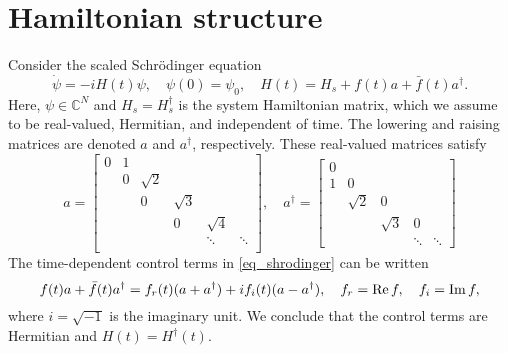 \documentclass[11pt]{article}
\begin{document}



\section{Hamiltonian structure}
Consider the scaled Schr\"odinger equation
\begin{equation}\label{eq_shrodinger}
\dot{\psi} = -i H(t) \psi,\quad \psi(0) = \psi_0,\quad H(t) = H_s + f(t)a + \bar{f}(t)a^\dag.
\end{equation}
Here, $\psi \in\mathbb{C}^N$ and $H_s = H_s^\dag$ is the system Hamiltonian matrix, which we assume to
be real-valued, Hermitian, and independent of time. The lowering and raising matrices are denoted
$a$ and $a^\dag$, respectively. These real-valued matrices satisfy
\begin{equation}\label{eq_matrices}
%
a = \begin{bmatrix}
0 & 1 & & & &\\
 & 0 & \sqrt{2} & & &\\
&  & 0 & \sqrt{3} & &\\
& &  & 0 & \sqrt{4} & \\
& &  &  & \ddots & \ddots\\
\end{bmatrix},\quad
%
a^\dag = \begin{bmatrix}
0 &  & & &\\
1 & 0 & & &\\
&  \sqrt{2} & 0 &  &\\
& &  \sqrt{3} & 0 & \\
& &  & \ddots & \ddots
\end{bmatrix}
\end{equation}
The time-dependent control terms in \eqref{eq_shrodinger} can be written
\[
f(t)a + \bar{f}(t)a^\dag =
f_r(t) (a + a^\dag) + i f_i(t) ( a- a^\dag),\quad f_r = {\rm Re}\, f,\quad f_i={\rm Im}\, f,
\]
where $i=\sqrt{-1}$ is the imaginary unit. We conclude that the control terms are Hermitian and
$H(t) = H^\dag(t)$.
\end{document}
